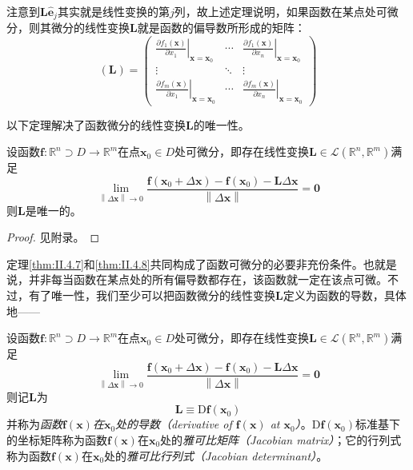 \documentclass[../main.tex]{subfiles}
\begin{document}
注意到$\mathbf{L\hat{e}}_j$其实就是线性变换的第$j$列，故上述定理说明，如果函数在某点处可微分，则其微分的线性变换$\mathbf{L}$就是函数的偏导数所形成的矩阵：
\[
    \left(\mathbf{L}\right)=\left(\begin{array}{ccc}
            \left.\frac{\partial f_1\left(\mathbf{x}\right)}{\partial x_1}\right|_{\mathbf{x}=\mathbf{x}_0} & \cdots & \left.\frac{\partial f_1\left(\mathbf{x}\right)}{\partial x_n}\right|_{\mathbf{x}=\mathbf{x}_0} \\
            \vdots                                                                                          & \ddots & \vdots                                                                                          \\
            \left.\frac{\partial f_m\left(\mathbf{x}\right)}{\partial x_1}\right|_{\mathbf{x}=\mathbf{x}_0} & \cdots & \left.\frac{\partial f_m\left(\mathbf{x}\right)}{\partial x_n}\right|_{\mathbf{x}=\mathbf{x}_0}
        \end{array}\right)
\]

以下定理解决了函数微分的线性变换$\mathbf{L}$的唯一性。

\begin{theorem}\label{thm:II.4.8}
    设函数$\mathbf{f}:\mathbb{R}^n\supset D\rightarrow\mathbb{R}^m$在点$\mathbf{x}_0\in D$处可微分，即存在线性变换$\mathbf{L}\in\mathcal{L}\left(\mathbb{R}^n,\mathbb{R}^m\right)$满足
    \[
        \lim_{\left\|\Delta\mathbf{x}\right\|\to 0}\frac{\mathbf{f}\left(\mathbf{x}_0+\Delta \mathbf{x}\right)-\mathbf{f}\left(\mathbf{x}_0\right)-\mathbf{L}\Delta\mathbf{x}}{\left\|\Delta\mathbf{x}\right\|}=\mathbf{0}
    \]
    则$\mathbf{L}$是唯一的。
\end{theorem}
\begin{proof}
    见附录。
\end{proof}

定理\ref{thm:II.4.7}和\ref{thm:II.4.8}共同构成了函数可微分的必要非充份条件。也就是说，并非每当函数在某点处的所有偏导数都存在，该函数就一定在该点可微\cite[“例2”,p.~21]{华工高数2009下}。不过，有了唯一性，我们至少可以把函数微分的线性变换$\mathbf{L}$定义为函数的导数，具体地——

\begin{definition}[向量函数的导数]\label{def:II.4.14}
    设函数$\mathbf{f}:\mathbb{R}^n\supset D\rightarrow\mathbb{R}^m$在点$\mathbf{x}_0\in D$处可微分，即存在线性变换$\mathbf{L}\in\mathcal{L}\left(\mathbb{R}^n,\mathbb{R}^m\right)$满足
    \[
        \lim_{\left\|\Delta\mathbf{x}\right\|\to 0}\frac{\mathbf{f}\left(\mathbf{x}_0+\Delta \mathbf{x}\right)-\mathbf{f}\left(\mathbf{x}_0\right)-\mathbf{L}\Delta\mathbf{x}}{\left\|\Delta\mathbf{x}\right\|}=\mathbf{0}
    \]
    则记$\mathbf{L}$为
    \[\mathbf{L}\equiv \mathrm{D}\mathbf{f}\left(\mathbf{x}_0\right)\]
    并称为\emph{函数$\mathbf{f}\left(\mathbf{x}\right)$在$\mathbf{x}_0$处的导数（derivative of $\mathbf{f}\left(\mathbf{x}\right)$ at $\mathbf{x}_0$）}。$\mathrm{D}\mathbf{f}\left(\mathbf{x}_0\right)$标准基下的坐标矩阵称为函数$\mathbf{f}\left(\mathbf{x}\right)$在$\mathbf{x}_0$处的\emph{雅可比矩阵（Jacobian matrix）}；它的行列式称为函数$\mathbf{f}\left(\mathbf{x}\right)$在$\mathbf{x}_0$处的\emph{雅可比行列式（Jacobian determinant）}。
\end{definition}
\end{document}
